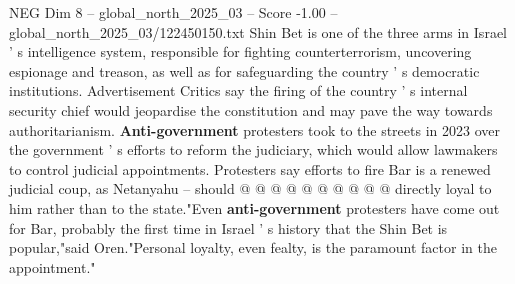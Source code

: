 \begin{textsample}{NEG Dim 8 – global\_north\_2025\_03 – Score -1.00 – global\_north\_2025\_03/122450150.txt}
Shin Bet is one of the three arms in Israel ' s intelligence system, responsible for fighting counterterrorism, uncovering espionage and treason, as well as for safeguarding the country ' s democratic institutions.
Advertisement Critics say the firing of the country ' s internal security chief would jeopardise the constitution and may pave the way towards authoritarianism. \textbf{Anti-government} protesters took to the streets in 2023 over the government ' s efforts to reform the judiciary, which would allow lawmakers to control judicial appointments.
Protesters say efforts to fire Bar is a renewed judicial coup, as Netanyahu -- should @ @ @ @ @ @ @ @ @ @ directly loyal to him rather than to the state."Even \textbf{anti-government} protesters have come out for Bar, probably the first time in Israel ' s history that the Shin Bet is popular,"said Oren."Personal loyalty, even fealty, is the paramount factor in the appointment."

\end{textsample}

